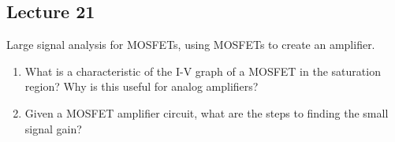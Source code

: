 \subsection*{Lecture 21}

Large signal analysis for MOSFETs, using MOSFETs to create an amplifier.

\begin{enumerate}
  \item What is a characteristic of the I-V graph of a MOSFET in the saturation region?
  Why is this useful for analog amplifiers?
  \item Given a MOSFET amplifier circuit, what are the steps to finding the small signal gain?
\end{enumerate}